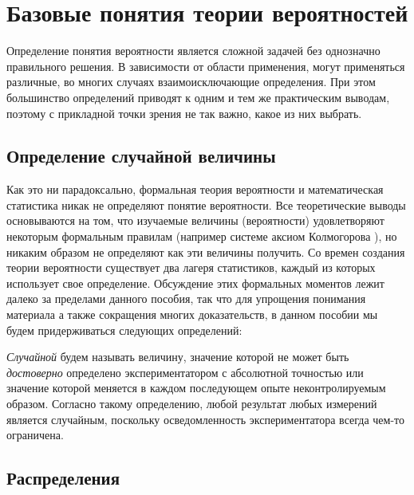 \chapter{Базовые понятия теории вероятностей}

\label{ch:prob}


Определение понятия вероятности является сложной задачей без однозначно правильного решения. В зависимости от области применения, могут применяться различные, во многих случаях взаимоисключающие определения. При этом большинство определений приводят к одним и тем же практическим выводам, поэтому с прикладной точки зрения не так важно, какое из них выбрать. 

\section{Определение случайной величины}

Как это ни парадоксально, формальная теория вероятности и математическая статистика никак не определяют понятие вероятности. Все теоретические выводы основываются на том, что изучаемые величины (вероятности) удовлетворяют некоторым формальным правилам (например системе аксиом Колмогорова ), но никаким образом не определяют как эти величины получить. Со времен создания теории вероятности существует два лагеря статистиков, каждый из которых использует свое определение. Обсуждение этих формальных моментов лежит далеко за пределами данного пособия, так что для упрощения понимания материала а также сокращения многих доказательств, в данном пособии мы будем придерживаться следующих определений:

\emph{Случайной} будем называть величину, значение которой не может быть \emph{достоверно} определено экспериментатором с абсолютной точностью или значение которой меняется в каждом последующем опыте неконтролируемым образом. Согласно такому определению, любой результат любых измерений является случайным, поскольку осведомленность экспериментатора всегда чем-то ограничена.

\section{Распределения}

